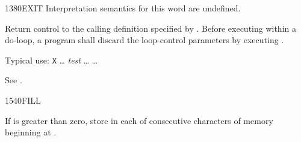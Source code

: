 \begin{worddef}{1380}{EXIT}
\interpret
	Interpretation semantics for this word are undefined.

\execute
	\stack{}{}

	Return control to the calling definition specified by
	. Before executing  within a
	do-loop, a program shall discard the loop-control parameters
	by executing .


	\begin{rationale} %
		Typical use:
			\word{:} \texttt{X} {\ldots}
				\emph{test} 
				{\ldots}  
			{\ldots} \word{;}
	\end{rationale}

	\begin{testing} %
		See .
	\end{testing}
\end{worddef}


\begin{worddef}{1540}{FILL}
\item {}

	If  is greater than zero, store  in each of
	 consecutive characters of memory beginning at
	.

	\begin{testing} %
		 \\

		 \\

		 \\
	\end{testing}
\end{worddef}


